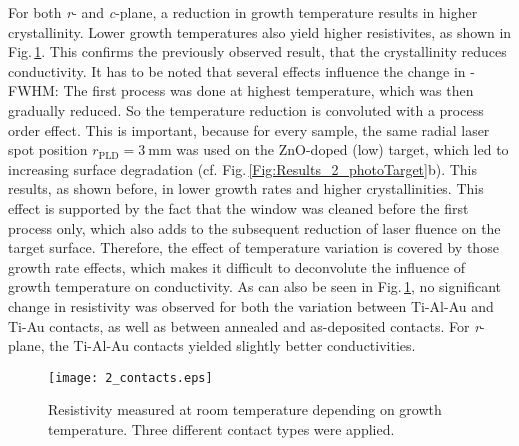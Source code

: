 For both \textit{r}- and \textit{c}-plane, a reduction in growth temperature results in higher crystallinity.
Lower growth temperatures also yield higher resistivites, as shown in Fig.\,\ref{Fig:Results_2_contacts}.
This confirms the previously observed result, that the crystallinity reduces conductivity.
It has to be noted that several effects influence the change in \textomega-FWHM:
The first process was done at highest temperature, which was then gradually reduced.
So the temperature reduction is convoluted with a process order effect.
This is important, because for every sample, the same radial laser spot position $r_\mathrm{PLD}=\qty{3}{\mm}$ was used on the ZnO-doped (low) target, which led to increasing surface degradation (cf. Fig.\,\ref{Fig:Results_2_photoTarget}b).
This results, as shown before, in lower growth rates and higher crystallinities.
This effect is supported by the fact that the window was cleaned before the first process only, which also adds to the subsequent reduction of laser fluence on the target surface.
Therefore, the effect of temperature variation is covered by those growth rate effects, which makes it difficult to deconvolute the influence of growth temperature on conductivity.
As can also be seen in Fig.\,\ref{Fig:Results_2_contacts}, no significant change in resistivity was observed for both the variation between Ti-Al-Au and Ti-Au contacts, as well as between annealed and as-deposited contacts.
For \textit{r}-plane, the Ti-Al-Au contacts yielded slightly better conductivities.
\begin{figure}
    \centering
    \texttt{[image: 2\_contacts.eps]}
    \caption{Resistivity measured at room temperature depending on growth temperature.
    Three different contact types were applied.}
    \label{Fig:Results_2_contacts}
\end{figure}
